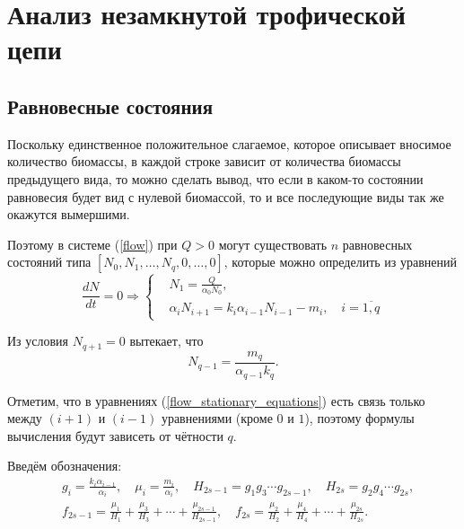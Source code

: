 \section{Анализ незамкнутой трофической цепи}
\subsection{Равновесные состояния}
    Поскольку единственное положительное слагаемое, которое описывает вносимое количество биомассы, в каждой строке зависит от количества биомассы предыдущего вида, то можно сделать вывод, что если в каком-то состоянии равновесия будет вид с нулевой биомассой, то и все последующие виды так же окажутся вымершими.

    Поэтому в системе (\ref{flow}) при \(Q > 0\) могут существовать \( n \) равновесных состояний типа \(\left[ N_0, N_1, \ldots, N_q, 0, \ldots, 0 \right]\), которые можно определить из уравнений
    \begin{equation} \label{flow_stationary_equations}
        \frac{dN}{dt} = 0 \Rightarrow
        \left\lbrace\begin{split}
            & N_1 = \frac{Q}{\alpha_0 N_0}, \\
            & \alpha_i N_{i+1} = k_i \alpha_{i-1} N_{i-1} - m_i, \quad i=\overline{1,q}                
        \end{split}\right.
    \end{equation}

    Из условия \( N_{q+1} = 0 \) вытекает, что 
    \begin{equation}
        N_{q-1} = \frac{m_q}{\alpha_{q-1} k_q}.
    \end{equation}

    Отметим, что в уравнениях (\ref{flow_stationary_equations}) есть связь только между \((i+1)\) и \((i-1)\) уравнениями (кроме \(0\) и \(1\)), поэтому формулы вычисления будут зависеть от чётности \(q\).

    Введём обозначения:
    \begin{equation} \label{flow_sub}
        \begin{split}
        & g_i = \frac{k_i \alpha_{i-1}}{\alpha_i}, \quad \mu_i = \frac{m_i}{\alpha_i}, \quad
        H_{2s-1} = g_1 g_3 \cdots g_{2s-1}, \quad H_{2s} = g_2 g_4 \cdots g_{2s}, \\
        & f_{2s-1} = \frac{\mu_1}{H_1} + \frac{\mu_3}{H_3} + \cdots + \frac{\mu_{2s-1}}{H_{2s-1}}, \quad
        f_{2s} = \frac{\mu_2}{H_2} + \frac{\mu_4}{H_4} + \cdots + \frac{\mu_{2s}}{H_{2s}}.
        \end{split}
    \end{equation}

